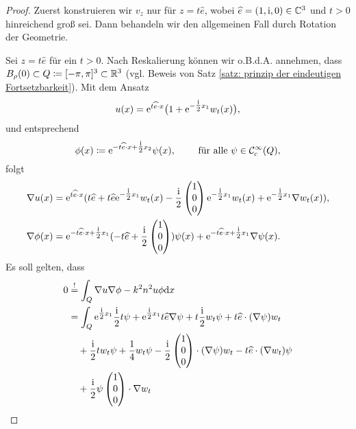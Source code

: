 \begin{proof}
	Zuerst konstruieren wir \(v_z\) nur für \(z=t\widehat{e}\), wobei \(\widehat{e}=(1,\mathrm{i},0)\in\mathbb{C}^3\) und \(t>0\) hinreichend groß sei. Dann behandeln wir den allgemeinen Fall durch Rotation der Geometrie.
	
	Sei \(z=t\widehat{e}\) für ein \(t>0\). Nach Reskalierung können wir o.B.d.A. annehmen, dass \(B_\rho(0)\subset Q\coloneqq[-\pi,\pi]^3\subset\mathbb{R}^3\) (vgl. Beweis von Satz \ref{satz: prinzip der eindeutigen Fortsetzbarkeit}). Mit dem Ansatz
	\begin{equation*}
		u(x)=\mathrm{e}^{t\widehat{e}\cdot x}\big(1+\mathrm{e}^{-\tfrac{\mathrm{i}}{2}x_1}w_t(x)\big),
	\end{equation*}
	und entsprechend
	\begin{equation*}
		\phi(x)\coloneqq\mathrm{e}^{-t\widehat{e}\cdot x+\tfrac{\mathrm{i}}{2}x_2}\psi(x),\qquad\text{ für alle }\psi\in\mathcal{C}_{\mathrm{c}}^\infty(Q),
	\end{equation*}
	folgt
	\begin{align*}
		\nabla u(x)&=\mathrm{e}^{t\widehat{e}\cdot x}(t\widehat{e}+t\widehat{e}\mathrm{e}^{-\tfrac{\mathrm{i}}{2}x_1}w_t(x)-\frac{\mathrm{i}}{2}\begin{pmatrix}1\\0\\0\end{pmatrix}\mathrm{e}^{-\tfrac{\mathrm{i}}{2}x_1}w_t(x)+\mathrm{e}^{-\tfrac{\mathrm{i}}{2}x_1}\nabla w_t(x)),\\
		\nabla\phi(x)&=\mathrm{e}^{-t\widehat{e}\cdot x+\tfrac{\mathrm{i}}{2}x_1}(-t\widehat{e}+\frac{\mathrm{i}}{2}\begin{pmatrix}1\\0\\0\end{pmatrix})\psi(x) + \mathrm{e}^{-t\widehat{e}\cdot x+\tfrac{\mathrm{i}}{2}x_1}\nabla\psi(x).
	\end{align*}
	Es soll gelten, dass
	\begin{align*}
		0&\overset{!}{=}\int_Q\nabla u\nabla\phi-k^2n^2u\phi\dx\\
		&=\int_Q\e^{\tfrac{\ii}{2}x_1}\frac{\ii}{2}t\psi+\e^{\tfrac{\ii}{2}x_1}t\widehat{e}\nabla\psi+t\frac{\ii}{2}w_t\psi+t\widehat{e}\cdot(\nabla\psi) w_t\\
		&\quad+\frac{\ii}{2}tw_t\psi+\frac{1}{4}w_t\psi-\frac{\ii}{2}\begin{pmatrix}1\\0\\0\end{pmatrix}\cdot(\nabla\psi)w_t-t\widehat{e}\cdot(\nabla w_t)\psi\\
		&\quad+\frac{\ii}{2}\psi\begin{pmatrix}1\\0\\0\end{pmatrix}\cdot\nabla w_t

\end{align*}
\end{proof}
